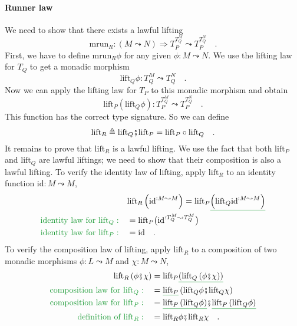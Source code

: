 \paragraph{Runner law}

We need to show that there exists a lawful lifting 
\[
\text{mrun}_{R}:\left(M\leadsto N\right)\Rightarrow T_{P}^{T_{Q}^{M}}\leadsto T_{P}^{T_{Q}^{N}}\quad.
\]
First, we have to define $\text{mrun}_{R}\phi$ for any given $\phi:M\leadsto N$.
We use the lifting law for $T_{Q}$ to get a monadic morphism
\[
\text{lift}_{Q}\phi:T_{Q}^{M}\leadsto T_{Q}^{N}\quad.
\]
Now we can apply the lifting law for $T_{P}$ to this monadic morphism
and obtain
\[
\text{lift}_{P}\left(\text{lift}_{Q}\phi\right):T_{P}^{T_{Q}^{M}}\leadsto T_{P}^{T_{Q}^{N}}\quad.
\]
This function has the correct type signature. So we can define
\[
\text{lift}_{R}\triangleq\text{lift}_{Q}\bef\text{lift}_{P}=\text{lift}_{P}\circ\text{lift}_{Q}\quad.
\]
It remains to prove that $\text{lift}_{R}$ is a lawful lifting. We
use the fact that both $\text{lift}_{P}$ and $\text{lift}_{Q}$ are
lawful liftings; we need to show that their composition is also a
lawful lifting. To verify the identity law of lifting, apply $\text{lift}_{R}$
to an identity function $\text{id}:M\leadsto M$,
\begin{align*}
 & \text{lift}_{R}\left(\text{id}^{:M\leadsto M}\right)=\text{lift}_{P}\gunderline{\left(\text{lift}_{Q}\text{id}^{:M\leadsto M}\right)}\\
{\color{greenunder}\text{identity law for }\text{lift}_{Q}:}\quad & =\text{lift}_{P}\big(\text{id}^{:T_{Q}^{M}\leadsto T_{Q}^{M}}\big)\\
{\color{greenunder}\text{identity law for }\text{lift}_{P}:}\quad & =\text{id}\quad.
\end{align*}
To verify the composition law of lifting, apply $\text{lift}_{R}$
to a composition of two monadic morphisms $\phi:L\leadsto M$ and
$\chi:M\leadsto N$,
\begin{align*}
\text{lift}_{R}\left(\phi\bef\chi\right) & =\text{lift}_{P}\gunderline{\left(\text{lift}_{Q}\left(\phi\bef\chi\right)\right)}\\
{\color{greenunder}\text{composition law for }\text{lift}_{Q}:}\quad & =\gunderline{\text{lift}_{P}}\left(\text{lift}_{Q}\phi\bef\text{lift}_{Q}\chi\right)\\
{\color{greenunder}\text{composition law for }\text{lift}_{P}:}\quad & =\gunderline{\text{lift}_{P}\left(\text{lift}_{Q}\phi\right)}\bef\gunderline{\text{lift}_{P}\left(\text{lift}_{Q}\phi\right)}\\
{\color{greenunder}\text{definition of }\text{lift}_{R}:}\quad & =\text{lift}_{R}\phi\bef\text{lift}_{R}\chi\quad.
\end{align*}


